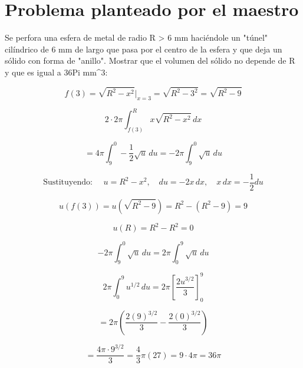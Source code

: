 \chapter*{Problema planteado por el maestro}


Se perfora una esfera de metal de radio R > 6 mm haciéndole un "túnel" cilíndrico de 6 mm de largo que pasa por el centro de la esfera y que deja un sólido con forma de "anillo".
Mostrar que el volumen del sólido no depende de R y que es igual a 36Pi mm^3:

\[
f(3) = \sqrt{R^2 - x^2} \Big|_{x=3} = \sqrt{R^2 - 3^2} = \sqrt{R^2 - 9}
\]

\[
2 \cdot 2\pi \int_{f(3)}^{R} x \sqrt{R^2 - x^2} \, dx
\]

\[
= 4\pi \int_{9}^{0} -\frac{1}{2} \sqrt{u} \, du = -2\pi \int_{9}^{0} \sqrt{u} \, du
\]

\[
\text{Sustituyendo: } 
\quad u = R^2 - x^2, \quad du = -2x \, dx, \quad x \, dx = -\frac{1}{2} du
\]

\[
u(f(3)) = u(\sqrt{R^2 - 9}) = R^2 - (R^2 - 9) = 9
\]

\[
u(R) = R^2 - R^2 = 0
\]

\[
-2\pi \int_{9}^{0} \sqrt{u} \, du = 2\pi \int_{0}^{9} \sqrt{u} \, du
\]

\[
2\pi \int_{0}^{9} u^{1/2} \, du = 2\pi \left[ \frac{2u^{3/2}}{3} \right]_0^9
\]

\[
= 2\pi \left( \frac{2(9)^{3/2}}{3} - \frac{2(0)^{3/2}}{3} \right)
\]

\[
= \frac{4\pi \cdot 9^{3/2}}{3} = \frac{4}{3}\pi (27) = 9 \cdot 4\pi = 36\pi
\]